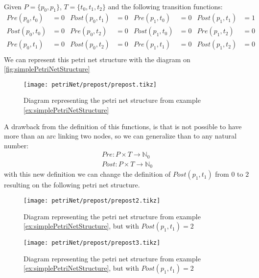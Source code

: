 \begin{example} ~\\
  \label{ex:simplePetriNetStructure}
  Given $P = \{p_0,p_1\}$, $T = \{t_0,t_1,t_2\}$ and the following transition
  functions:
  \begin{align*}
   Pre(p_0,t_0)& = 0  &  Post(p_0,t_1) &= 0 & Pre(p_1,t_0) &= 0 &  Post(p_1,t_1) &= 1 \\
   Post(p_0,t_0) &= 0  &    Pre(p_0,t_2) &= 0   & Post(p_1,t_0) &= 0   & Pre(p_1,t_2) &= 0\\
   Pre(p_0,t_1) &= 0    &  Post(p_0,t_2) &= 0  &  Pre(p_1,t_1) &= 0     &Post(p_1,t_2) &= 0\\
  \end{align*}
  We can represent this petri net structure with the diagram on \autoref{fig:simplePetriNetStructure}
\end{example}
\begin{figure}[H]
  \centering
  \texttt{[image: petriNet/prepost/prepost.tikz]}
  \caption{Diagram representing the petri net structure from example \ref{ex:simplePetriNetStructure}}
\label{fig:simplePetriNetStructure}
\end{figure}
A drawback from the definition of this functions, is that is not possible to
have more than an arc linking two nodes, so we can generalize than to any natural number:
  \begin{align*}
    Pre:  P \times T \rightarrow \mathbb{N}_0\\
    Post: P \times T \rightarrow \mathbb{N}_0
  \end{align*}
with this new definition we can change the definition of $Post(p_1,t_1)$ from
$0$ to $2$ resulting on the following petri net structure.
\begin{figure}[H]
  \centering
  \texttt{[image: petriNet/prepost/prepost2.tikz]}
  \caption{Diagram representing the petri net structure from example
    \ref{ex:simplePetriNetStructure}, but with $Post(p_1,t_1)=2$}
\label{fig:simplePetriNetStructureNatural}
\end{figure}

\todo{}
\begin{figure}[H]
  \centering
  \texttt{[image: petriNet/prepost/prepost3.tikz]}
  \caption{Diagram representing the petri net structure from example
    \ref{ex:simplePetriNetStructure}, but with $Post(p_1,t_1)=2$}
\label{fig:simplePetriNetStructureGeneralized}
\end{figure}

